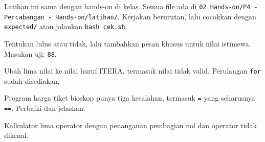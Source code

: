 \documentclass[a4paper]{article}
\begin{document}
Latihan ini sama dengan hands-on di kelas. Semua file ada di \texttt{02 Hands-on/P4 - Percabangan - Hands-on/latihan/}. Kerjakan berurutan, lalu cocokkan dengan \texttt{expected/} atau jalankan \texttt{bash cek.sh}.
\par\vspace{4pt}\par\vspace{6pt}
Tentukan lulus atau tidak, lalu tambahkan pesan khusus untuk nilai istimewa. Masukan uji: \texttt{88}.

Ubah lima nilai ke nilai huruf ITERA, termasuk nilai tidak valid. Perulangan \texttt{for} sudah disediakan.

Program harga tiket bioskop punya tiga kesalahan, termasuk \texttt{=} yang seharusnya \texttt{==}. Perbaiki dan jelaskan.

Kalkulator lima operator dengan penanganan pembagian nol dan operator tidak dikenal.
\end{document}
